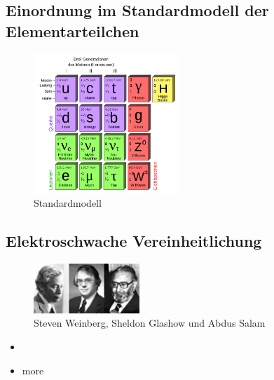 \subsection{Einordnung im Standardmodell der Elementarteilchen}

\begin{iframe}
	\begin{figure}
		\centering
		\includegraphics[width=5.5cm]{img/standardmodel}
		\caption*{Standardmodell\cite{standardmodel}}
	\end{figure}
\end{iframe}


\subsection{Elektroschwache Vereinheitlichung}
\begin{iframe}
	
	\begin{figure}
		\includegraphics[width=4cm]{img/weinberg_glasgow_salam}
		\caption*{Steven Weinberg, Sheldon Glashow und Abdus Salam\cite{GSW}}
	\end{figure}
	\begin{itemize}
		\item
	\item more
	\end{itemize}
\end{iframe}

